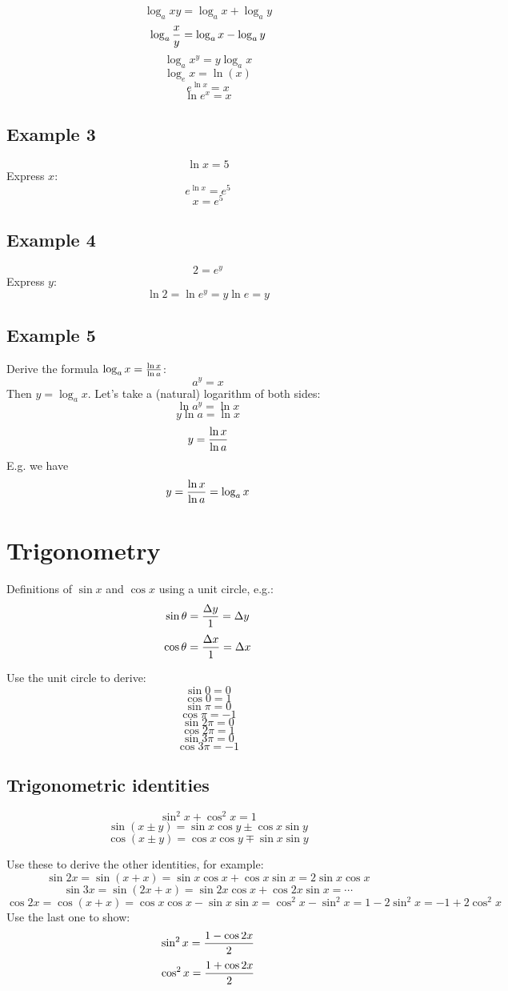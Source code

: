 \documentclass[10pt]{article}
\begin{document}
$$\log_a xy = \log_a x + \log_a y$$
$$\log_a {x\over y} = \log_a x - \log_a y$$
$$\log_a x^y = y\log_a x$$
$$\log_e x = \ln(x)$$
$$e^{\ln x} = x$$
$$\ln e^x=x$$

\subsection{Example 3}

$$\ln x = 5$$
Express $x$:
$$e^{\ln x} = e^5$$
$$x = e^5$$

\subsection{Example 4}

$$2 = e^y$$
Express $y$:
$$\ln 2 = \ln e^y = y\ln e = y$$

\subsection{Example 5}

Derive the formula $\log_a x = {\ln x\over \ln a}$:
$$a^y = x$$
Then $y = \log_a x$. Let's take a (natural) logarithm of both sides:
$$\ln a^y = \ln x$$
$$y \ln a = \ln x$$
$$y = {\ln x\over\ln a}$$
E.g. we have
$$y = {\ln x\over\ln a} = \log_a x$$

\section{Trigonometry}

Definitions of $\sin x$ and $\cos x$ using a unit circle, e.g.:
$$\sin\theta = {\Delta y\over 1} = \Delta y$$
$$\cos\theta = {\Delta x\over 1} = \Delta x$$

Use the unit circle to derive:
$$\sin 0 = 0$$
$$\cos 0 = 1$$
$$\sin \pi = 0$$
$$\cos \pi = -1$$
$$\sin 2\pi = 0$$
$$\cos 2\pi = 1$$
$$\sin 3\pi = 0$$
$$\cos 3\pi = -1$$

\subsection{Trigonometric identities}

$$\sin^2x + \cos^2x = 1$$
$$\sin(x\pm y)=\sin x\cos y \pm \cos x\sin y$$
$$\cos(x\pm y)=\cos x\cos y \mp \sin x\sin y$$

Use these to derive the other identities, for example:
$$\sin2x = \sin(x+x) = \sin x \cos x + \cos x\sin x = 2\sin x\cos x$$
$$\sin3x = \sin(2x+x) = \sin 2x \cos x + \cos 2x\sin x = \cdots$$
$$\cos2x = \cos(x+x) = \cos x \cos x - \sin x\sin x = \cos^2 x - \sin^2 x =
1-2\sin^2 x = -1+2\cos^2x$$
Use the last one to show:
$$\sin^2x = {1-\cos2x\over 2}$$
$$\cos^2x = {1+\cos2x\over 2}$$
\end{document}
